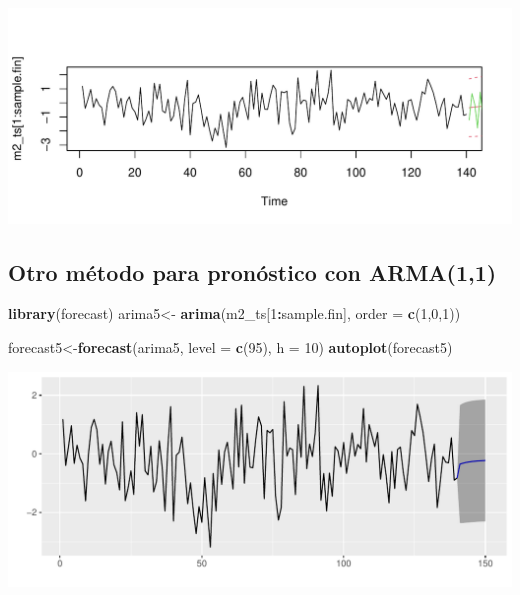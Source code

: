 \documentclass[
  11pt,
]{article}
\newenvironment{Shaded}{\begin{snugshade}}{\end{snugshade}}
\newcommand{\DataTypeTok}[1]{\textcolor[rgb]{0.13,0.29,0.53}{#1}}
\newcommand{\DecValTok}[1]{\textcolor[rgb]{0.00,0.00,0.81}{#1}}
\newcommand{\KeywordTok}[1]{\textcolor[rgb]{0.13,0.29,0.53}{\textbf{#1}}}
\newcommand{\NormalTok}[1]{#1}
\newcommand{\OperatorTok}[1]{\textcolor[rgb]{0.81,0.36,0.00}{\textbf{#1}}}
\newcommand{\StringTok}[1]{\textcolor[rgb]{0.31,0.60,0.02}{#1}}
\begin{document}
\begin{center}\includegraphics[width=0.9\linewidth]{RmdFigs/forecast2_m5-1} \end{center}

\hypertarget{otro-muxe9todo-para-pronuxf3stico-con-arma11}{%
\subsection{Otro método para pronóstico con
ARMA(1,1)}\label{otro-muxe9todo-para-pronuxf3stico-con-arma11}}

\begin{Shaded}
\begin{Highlighting}[]
\KeywordTok{library}\NormalTok{(forecast)}
\NormalTok{arima5<-}\StringTok{ }\KeywordTok{arima}\NormalTok{(m2_ts[}\DecValTok{1}\OperatorTok{:}\NormalTok{sample.fin], }\DataTypeTok{order =} \KeywordTok{c}\NormalTok{(}\DecValTok{1}\NormalTok{,}\DecValTok{0}\NormalTok{,}\DecValTok{1}\NormalTok{))}
\end{Highlighting}
\end{Shaded}

\begin{Shaded}
\begin{Highlighting}[]
\NormalTok{forecast5<-}\KeywordTok{forecast}\NormalTok{(arima5, }\DataTypeTok{level =} \KeywordTok{c}\NormalTok{(}\DecValTok{95}\NormalTok{), }\DataTypeTok{h =} \DecValTok{10}\NormalTok{)}
\KeywordTok{autoplot}\NormalTok{(forecast5)}
\end{Highlighting}
\end{Shaded}

\begin{center}\includegraphics[width=0.9\linewidth]{RmdFigs/f_otro2_2-1} \end{center}
\end{document}
